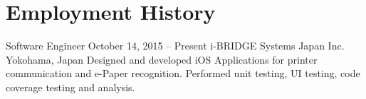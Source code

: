\section*{Employment History}

\employment
	{Software Engineer}
    {October 14, 2015 -- Present}
    {i-BRIDGE Systems Japan Inc.}
    {Yokohama, Japan}
    {Designed and developed iOS Applications for printer communication and e-Paper recognition. Performed unit testing, UI testing, code coverage testing and analysis.}

